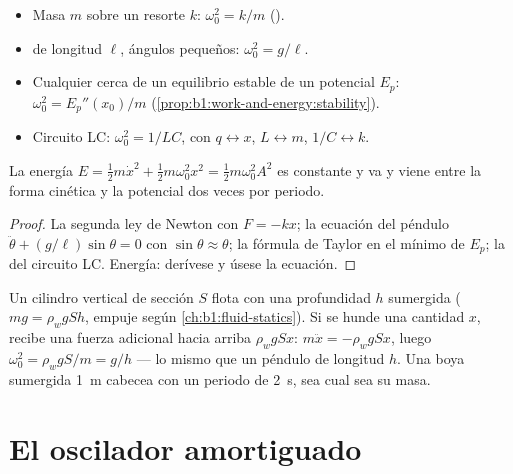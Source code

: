 \begin{proposition}\label{prop:b1:oscillators-resonance:sources}
\begin{itemize}
  \item Masa $m$ sobre un resorte $k$: $\omega_0^2 = k/m$ ().
  \item {} de longitud $\ell$, ángulos pequeños: $\omega_0^2 = g/\ell$.
  \item Cualquier  cerca de un equilibrio estable de un
        potencial $E_p$: $\omega_0^2 = E_p''(x_0)/m$
        (\cref{prop:b1:work-and-energy:stability}).
  \item Circuito LC: $\omega_0^2 = 1/LC$, con $q \leftrightarrow x$,
        $L \leftrightarrow m$, $1/C \leftrightarrow k$.
\end{itemize}
La energía $E = \tfrac12 m\dot x^2 + \tfrac12 m\omega_0^2x^2 = \tfrac12
m\omega_0^2A^2$ es constante y va y viene entre la forma cinética y la
potencial dos veces por periodo.
\end{proposition}

\begin{proof}
La segunda ley de Newton con $F = -kx$; la ecuación del péndulo
$\ddot\theta + (g/\ell)\sin\theta = 0$ con $\sin\theta \approx \theta$; la
fórmula de Taylor en el mínimo de $E_p$; la  del circuito
LC. Energía: derívese y úsese la ecuación.
\end{proof}

\begin{example}\label{ex:b1:oscillators-resonance:bob}
Un cilindro vertical de sección $S$ flota con una profundidad $h$
sumergida ($mg = \rho_wgSh$, empuje según \cref{ch:b1:fluid-statics}). Si
se hunde una cantidad $x$, recibe una fuerza adicional hacia arriba
$\rho_wgSx$: $m\ddot x = -\rho_wgSx$, luego $\omega_0^2 = \rho_wgS/m = g/h$
--- lo mismo que un péndulo de longitud $h$. Una boya sumergida
\qty{1}{m} cabecea con un periodo de \qty{2}{s}, sea cual sea su masa.
\end{example}

\section{El oscilador amortiguado}

